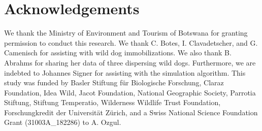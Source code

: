 \documentclass[abstract=on,10pt,a4paper,bibliography=totocnumbered]{article}
\begin{document}
\section{Acknowledgements}
We thank the Ministry of Environment and Tourism of Botswana for granting
permission to conduct this research. We thank C. Botes, I. Clavadetscher, and G.
Camenisch for assisting with wild dog immobilizations. We also thank B. Abrahms
for sharing her data of three dispersing wild dogs. Furthermore, we are indebted
to Johannes Signer for assisting with the simulation algorithm. This study was
funded by Basler Stiftung für Biologische Forschung, Claraz Foundation, Idea
Wild, Jacot Foundation, National Geographic Society, Parrotia Stiftung, Stiftung
Temperatio, Wilderness Wildlife Trust Foundation, Forschungkredit der
Universität Zürich, and a Swiss National Science Foundation Grant
(31003A\_182286) to A. Ozgul.

\newpage
\begingroup
\singlespacing

\endgroup
\end{document}
